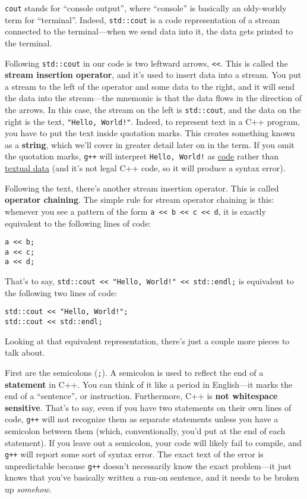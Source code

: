 \documentclass{article}
\begin{document}
\texttt{cout} stands for ``console output'', where ``console'' is basically an oldy-worldy term for ``terminal''. Indeed, \texttt{std::cout} is a code representation of a stream connected to the terminal---when we send data into it, the data gets printed to the terminal.

Following \texttt{std::cout} in our code is two leftward arrows, \texttt{<<}. This is called the \textbf{stream insertion operator}, and it's used to insert data into a stream. You put a stream to the left of the operator and some data to the right, and it will send the data into the stream---the mnemonic is that the data flows in the direction of the arrows. In this case, the stream on the left is \texttt{std::cout}, and the data on the right is the text, \texttt{"Hello, World!"}. Indeed, to represent text in a C++ program, you have to put the text inside quotation marks. This creates something known as a \textbf{string}, which we'll cover in greater detail later on in the term. If you omit the quotation marks, \texttt{g++} will interpret \texttt{Hello, World!} as \ul{code} rather than \ul{textual data} (and it's not legal C++ code, so it will produce a syntax error).

Following the text, there's another stream insertion operator. This is called \textbf{operator chaining}. The simple rule for stream operator chaining is this: whenever you see a pattern of the form \texttt{a << b << c << d}, it is exactly equivalent to the following lines of code:

\begin{verbatim}
a << b;
a << c;
a << d;
\end{verbatim}

That's to say, \texttt{std::cout << "Hello, World!" << std::endl;} is equivalent to the following two lines of code:

\begin{verbatim}
std::cout << "Hello, World!";
std::cout << std::endl;
\end{verbatim}

Looking at that equivalent representation, there's just a couple more pieces to talk about.

First are the semicolons (\texttt{;}). A semicolon is used to reflect the end of a \textbf{statement} in C++. You can think of it like a period in English---it marks the end of a ``sentence'', or instruction. Furthermore, C++ is \textbf{not whitespace sensitive}. That's to say, even if you have two statements on their own lines of code, \texttt{g++} will not recognize them as separate statements unless you have a semicolon between them (which, conventionally, you'd put at the end of each statement). If you leave out a semicolon, your code will likely fail to compile, and \texttt{g++} will report some sort of syntax error. The exact text of the error is unpredictable because \texttt{g++} doesn't necessarily know the exact problem---it just knows that you've basically written a run-on sentence, and it needs to be broken up \textit{somehow}.
\end{document}
